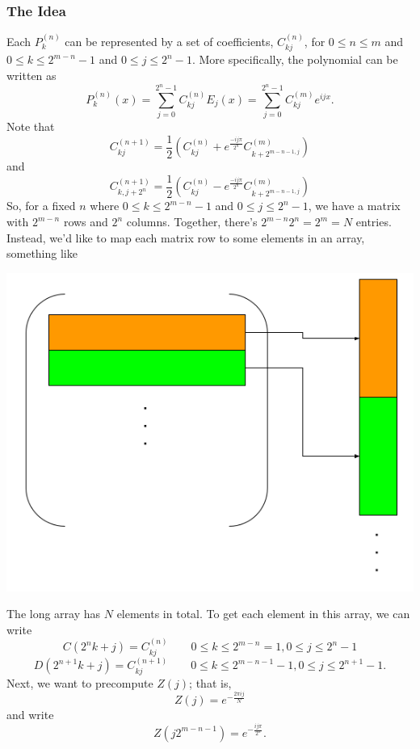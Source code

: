 \documentclass[letterpaper]{article}
\begin{document}
\subsubsection{The Idea}
Each $P_{k}^{(n)}$ can be represented by a set of coefficients, $C_{kj}^{(n)}$, for $0 \leq n \leq m$ and $0 \leq k \leq 2^{m - n} - 1$ and $0 \leq j \leq 2^n - 1$. More specifically, the polynomial can be written as 
\[P_{k}^{(n)}(x) = \sum_{j = 0}^{2^{n} - 1} C_{kj}^{(n)} E_{j}(x) = \sum_{j = 0}^{2^{n} - 1} C_{kj}^{(m)} e^{ijx}.\]
Note that 
\[C_{kj}^{(n + 1)} = \frac{1}{2}\left(C_{kj}^{(n)} + e^{\frac{-ij\pi}{2^{n}}} C_{k + 2^{m - n - 1, j}}^{(m)}\right)\]
and 
\[C_{k, j + 2^{n}}^{(n + 1)} = \frac{1}{2}\left(C_{kj}^{(n)} - e^{\frac{-ij\pi}{2^{n}}} C_{k + 2^{m - n - 1, j}}^{(m)}\right)\]
So, for a fixed $n$ where $0 \leq k \leq 2^{m - n} - 1$ and $0 \leq j \leq 2^{n} - 1$, we have a matrix with $2^{m - n}$ rows and $2^n$ columns. Together, there's $2^{m - n} 2^n = 2^m = N$ entries. Instead, we'd like to map each matrix row to some elements in an array, something like 
\begin{center}
    \includegraphics[scale=0.5]{../assets/matrix_to_arr.png}
\end{center}
The long array has $N$ elements in total. To get each element in this array, we can write 
\[C(2^{n}k + j) = C_{kj}^{(n)} \qquad 0 \leq k \leq 2^{m - n} = 1, 0 \leq j \leq 2^{n} - 1\]
\[D(2^{n + 1} k + j) = C_{kj}^{(n + 1)} \qquad 0 \leq k \leq 2^{m - n - 1} - 1, 0 \leq j \leq 2^{n + 1} - 1.\]
Next, we want to precompute $Z(j)$; that is, 
\[Z(j) = e^{-\frac{2\pi i j}{N}}\]
and write 
\[Z(j2^{m - n - 1}) = e^{-\frac{ij\pi}{2^n}}.\]
\end{document}

